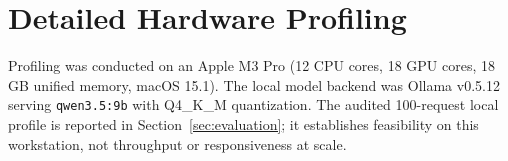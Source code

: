 \ifllmresults

\fi


\section{Detailed Hardware Profiling}
\label{app:hardware}

Profiling was conducted on an Apple M3 Pro (12 CPU cores, 18 GPU cores, 18\,GB unified memory, macOS 15.1). The local model backend was Ollama v0.5.12 serving \texttt{qwen3.5:9b} with Q4\_K\_M quantization. The audited 100-request local profile is reported in Section~\ref{sec:evaluation}; it establishes feasibility on this workstation, not throughput or responsiveness at scale.
